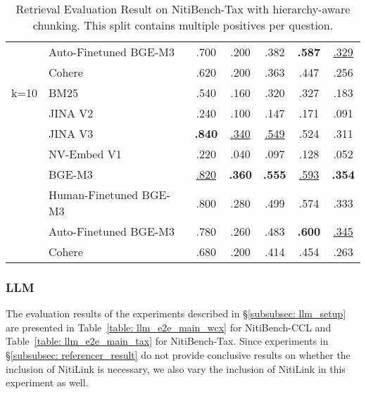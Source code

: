 \begin{table}[!ht]
\begin{tabular}{@{}clccccc@{}}
      & Auto-Finetuned BGE-M3  & .700          & .200          & .382          & \textbf{.587} & \underline{.329}    \\
      & Cohere                 & .620          & .200          & .363          & .447          & .256          \\ \midrule
k=10  & BM25                   & .540          & .160          & .320          & .327          & .183          \\
      & JINA V2                & .240          & .100          & .147          & .171          & .091          \\
      & JINA V3                & \textbf{.840} & \underline{.340}    & \underline{.549}    & .524          & .311          \\
      & NV-Embed V1            & .220          & .040          & .097          & .128          & .052          \\
      & BGE-M3                 & \underline{.820}    & \textbf{.360} & \textbf{.555} & \underline{.593}    & \textbf{.354} \\
      & Human-Finetuned BGE-M3 & .800          & .280          & .499          & .574          & .333          \\
      & Auto-Finetuned BGE-M3  & .780          & .260          & .483          & \textbf{.600} & \underline{.345}    \\
      & Cohere                 & .680          & .200          & .414          & .454          & .263          \\ \bottomrule
\end{tabular}
\caption{Retrieval Evaluation Result on NitiBench-Tax with hierarchy-aware chunking. This split contains multiple positives per question.}
\label{table: retrieval_tax}
\end{table}



\subsubsection{LLM}
\label{subsubsec: llm_result}

The evaluation results of the experiments described in \S\ref{subsubsec: llm_setup} are presented in Table~\ref{table: llm_e2e_main_wcx} for NitiBench-CCL and Table~\ref{table: llm_e2e_main_tax} for NitiBench-Tax. 
%
Since experiments in \S\ref{subsubsec: referencer_result} do not provide conclusive results on whether the inclusion of NitiLink is necessary, we also vary the inclusion of NitiLink in this experiment as well.


